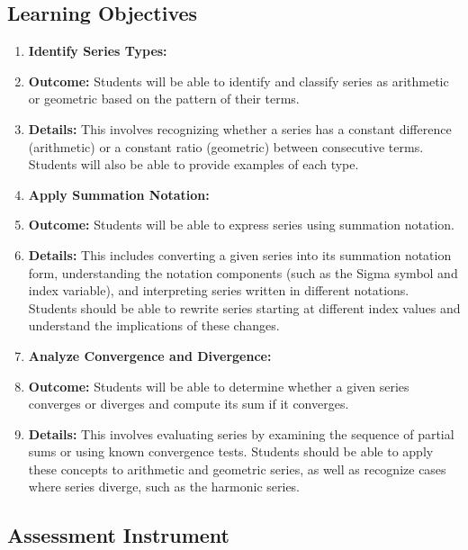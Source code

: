 \subsection{Learning Objectives}

\begin{enumerate}
    \item \textbf{Identify Series Types:}
    \item \textbf{Outcome:} Students will be able to identify and classify series as arithmetic or geometric based on the pattern of their terms.
    \item \textbf{Details:} This involves recognizing whether a series has a constant difference (arithmetic) or a constant ratio (geometric) between consecutive terms. Students will also be able to provide examples of each type.
    \item \textbf{Apply Summation Notation:}
    \item \textbf{Outcome:} Students will be able to express series using summation notation.
    \item \textbf{Details:} This includes converting a given series into its summation notation form, understanding the notation components (such as the Sigma symbol and index variable), and interpreting series written in different notations. Students should be able to rewrite series starting at different index values and understand the implications of these changes.
    \item \textbf{Analyze Convergence and Divergence:}
    \item \textbf{Outcome:} Students will be able to determine whether a given series converges or diverges and compute its sum if it converges.
    \item \textbf{Details:} This involves evaluating series by examining the sequence of partial sums or using known convergence tests. Students should be able to apply these concepts to arithmetic and geometric series, as well as recognize cases where series diverge, such as the harmonic series.
\end{enumerate}

\subsection{Assessment Instrument}

